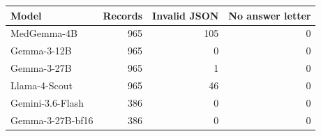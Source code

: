 \begin{tabular}{lrrr}
\toprule
Model & Records & Invalid JSON & No answer letter \\
\midrule
MedGemma-4B & 965 & 105 & 0 \\
Gemma-3-12B & 965 & 0 & 0 \\
Gemma-3-27B & 965 & 1 & 0 \\
Llama-4-Scout & 965 & 46 & 0 \\
Gemini-3.6-Flash & 386 & 0 & 0 \\
Gemma-3-27B-bf16 & 386 & 0 & 0 \\
\bottomrule
\end{tabular}
